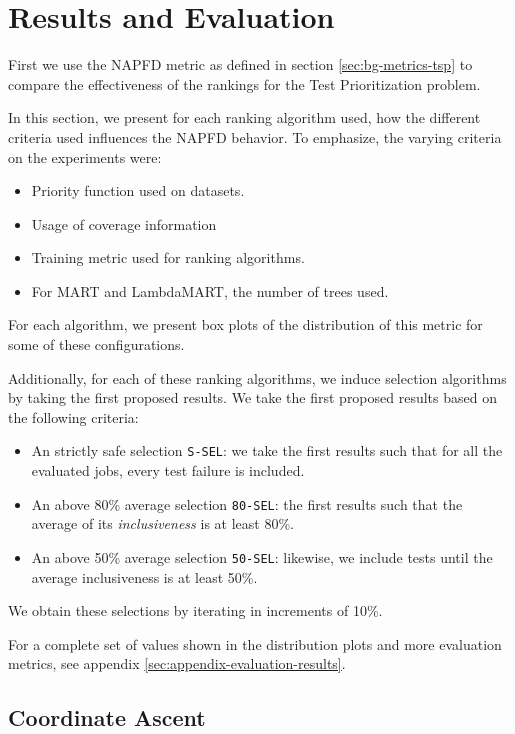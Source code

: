 \chapter{Results and Evaluation}\label{s:results}

First we use the NAPFD metric as defined in section \ref{sec:bg-metrics-tsp} to compare the effectiveness of the 
rankings for the Test Prioritization problem.

In this section, we present for each ranking algorithm used, how the different criteria used influences the
NAPFD behavior. To emphasize, the varying criteria on the experiments were:
\begin{itemize}
    \item Priority function used on datasets.
    \item Usage of coverage information
    \item Training metric used for ranking algorithms.
    \item For MART and LambdaMART, the number of trees used.
\end{itemize}

For each algorithm, we present box plots of the distribution of this metric for some of these configurations. 

Additionally, for each of these ranking algorithms, we induce selection algorithms by taking the first proposed
results. We take the first proposed results based on the following criteria:
\begin{itemize}
    \item An strictly safe selection \texttt{S-SEL}: we take the first results such that for all the evaluated jobs, every 
    test failure is included.
    \item An above 80\% average selection \texttt{80-SEL}: the first results such that the average of its \emph{inclusiveness}
    is at least 80\%.
    \item An above 50\% average selection \texttt{50-SEL}: likewise, we include tests until the average inclusiveness is at least 50\%.
\end{itemize}

We obtain these selections by iterating in increments of 10\%.

For a complete set of values shown in the distribution plots and more evaluation metrics, see appendix \ref{sec:appendix-evaluation-results}.

\section{Coordinate Ascent}

